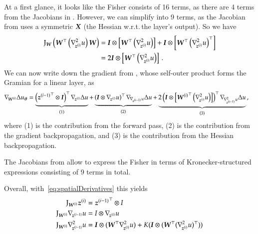 At a first glance, it looks like the Fisher consists of 16 terms, as there are 4 terms from the Jacobians in .
However, we can simplify into 9 terms, as the Jacobian from  uses a symmetric ${\boldsymbol{X}}$ (the Hessian w.r.t.\,the layer's output).
So we have
\begin{align*}
  \mathrm{J}_{{\boldsymbol{W}}}\left( {\boldsymbol{W}}^{\top} \left( \nabla_{\!{{\boldsymbol{z}}^{(i)}}}^{2}u  \right){\boldsymbol{W}} \right)
  &= {\boldsymbol{I}} \otimes
    \left[
    {\boldsymbol{W}}^{\top} \left( \nabla_{\!{{\boldsymbol{z}}^{(i)}}}^{2}u  \right)
    \right]
    +
    {\boldsymbol{I}} \otimes
    \left[
    {\boldsymbol{W}}^{\top}\left( \nabla_{\!{{\boldsymbol{z}}^{(i)}}}^{2}u  \right)^{\top}
    \right]
  \\
  &=
    2 {\boldsymbol{I}} \otimes
    \left[
    {\boldsymbol{W}}^{\top} \left( \nabla_{\!{{\boldsymbol{z}}^{(i)}}}^{2}u \right)
    \right]
    \,.
\end{align*}
We can now write down the gradient from , whose
self-outer product forms the Gramian for a linear layer, as
\begin{align*}
  \begin{split}
    \grad{\mW^{(i)}} \Delta u_{\vtheta}
    &=
      \underbrace{
      \left(
      {\vz^{(i-1)}}^\top\otimes \mI
      \right)^{\top}
      \grad{\vz^{(i)}}\Delta u
      }_{(1)}
      +
      \underbrace{
      \left(
      \mI \otimes \grad{\vz^{(i)}}u
      \right)^{\top}
      \grad{\grad{\vz^{(i-1)}}u}\Delta u
      }_{(2)}
      +
      \underbrace{
      2
      \left(
      \mI \otimes
      \left[
      {\mW^{(i)}}^{\top} \left( \gradsquared{\vz^{(i)}}u \right)
      \right]
      \right)^{\top}
      \grad{\gradsquared{\vz^{(i-1)}}u}\Delta u
      }_{(3)}
      \,,
  \end{split}
\end{align*}
where (1) is the contribution from the forward pass, (2) is the contribution from the gradient backpropagation, and (3) is the contribution from the Hessian backpropagation.

The Jacobians from  allow to express the Fisher in
terms of Kronecker-structured expressions consisting of 9 terms in total.


Overall, with~\eqref{eq:spatialDerivatives} this yields
\begin{align}
  \begin{split}
    \mathrm{J}_{{\boldsymbol{W}}^{(i)}}{\boldsymbol{z}}^{(i)}
    &=
      {{\boldsymbol{z}}^{(i-1)}}^\top\otimes I
    \\
    \mathrm{J}_{{\boldsymbol{W}}^{(i)}}\nabla_{\!{{\boldsymbol{z}}^{(i-1)}}}u
    &=
      I\otimes
      \nabla_{\!{{\boldsymbol{z}}^{(i)}}}u
    \\
    \mathrm{J}_{{\boldsymbol{W}}^{(i)}}\nabla_{\!{{\boldsymbol{z}}^{(i-1)}}}^{2}u
    &=
      {\boldsymbol{I}} \otimes ({\boldsymbol{W}}^{\top}\nabla_{\!{{\boldsymbol{z}}^{(i)}}}^{2}u) + K ({\boldsymbol{I}} \otimes ({\boldsymbol{W}}^{\top}(\nabla_{\!{{\boldsymbol{z}}^{(i)}}}^{2}u)^{\top}))
  \end{split}
\end{align}


